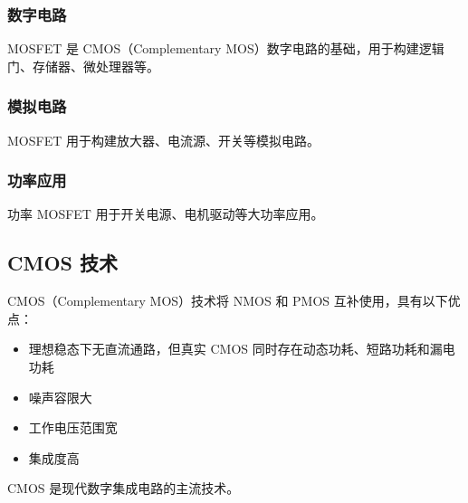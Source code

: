 \subsubsection{数字电路}

MOSFET 是 CMOS（Complementary MOS）数字电路的基础，用于构建逻辑门、存储器、微处理器等。

\subsubsection{模拟电路}

MOSFET 用于构建放大器、电流源、开关等模拟电路。

\subsubsection{功率应用}

功率 MOSFET 用于开关电源、电机驱动等大功率应用。

\subsection{CMOS 技术}

CMOS（Complementary MOS）技术将 NMOS 和 PMOS 互补使用，具有以下优点：

\begin{itemize}
  \item 理想稳态下无直流通路，但真实 CMOS 同时存在动态功耗、短路功耗和漏电功耗
  \item 噪声容限大
  \item 工作电压范围宽
  \item 集成度高
\end{itemize}

CMOS 是现代数字集成电路的主流技术。
